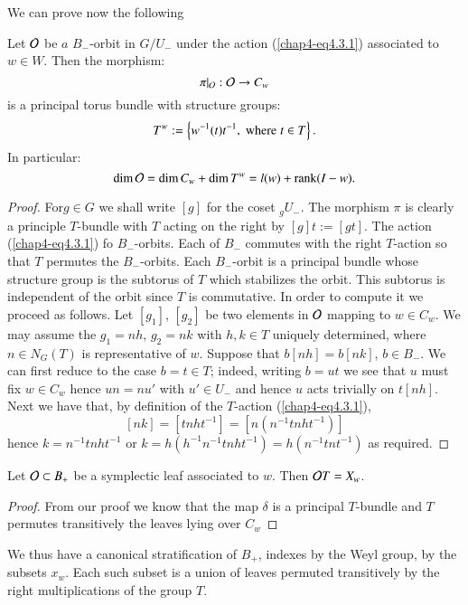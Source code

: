 We can prove now the following

\begin{prop*}
Let $\mathcal{O}$ be $a$ $B_{-}$-orbit in $G/U_{-} $ under the action (\ref{chap4-eq4.3.1}) associated to $w \in W$. Then the morphism:
$$
\pi|_{\mathcal{O}} :\mathcal{O} \rightarrow C_{w}
$$
is a principal torus bundle with structure groups:
$$
T^{w}:= \left\{w^{-1}(t)t^{-1},\; \text{\rm where} \; t\in T\right\}.
$$
In particular:
$$
\dim\mathcal{O} = \dim C_{w} + \dim T^{w} = l(w) + \operatorname{rank}(I -w).
$$
\end{prop*}

\begin{proof}
For\pageoriginale ${g} \in G$ we shall write $[{g}]$ for the coset ${}_{{g}}U_{-}$. The morphism $\pi$ is clearly a principle $T$-bundle with $T$ acting on the right by $[{g}]t := [{gt}]$. The action (\ref{chap4-eq4.3.1}) fo $B_{-}$-orbits. Each of $B_{-}$ commutes with the right $T$-action so that $T$ permutes the $B_{-}$-orbits. Each $B_{-}$-orbit is a principal bundle whose structure group is the subtorus of $T$ which stabilizes the orbit. This subtorus is independent of the orbit since $T$ is commutative. In order to compute it we proceed as follows. Let $[{g_{1}}]$, $[{g_{2}}]$ be two elements in $\mathcal{O}$ mapping to $w \in C_{w}$. We may assume the ${g_{1}} = nh$, ${g_{2}} = nk$ with $h, k \in T$ uniquely determined, where $n\in N_{G}(T)$ is representative of $w$. Suppose that $b[nh] = b[nk]$, $b \in B_{-}$. We can first reduce to the case $b=t \in T$; indeed, writing $b = ut$ we see that $u$ must fix $w \in C_{w}$ hence $un = nu'$ with $u' \in U_{-}$ and hence $u$ acts trivially on $t[nh]$. Next we have that, by definition of the $T$-action (\ref{chap4-eq4.3.1}),
$$
[nk] = \left[tnht^{-1}\right] = \left[n(n^{-1}tnht^{-1})\right]
$$
hence $k=n^{-1}tnht^{-1}$ or $k=h\left(h^{-1}n^{-1}tnht^{-1}\right) = h\left(n^{-1}tnt^{-1}\right)$ as required.
\end{proof}

\begin{lemma*}
Let $\mathcal{O} \subset B_{+}$ be a symplectic leaf associated to $w$. Then $\mathcal{O} T = X_{w}$.
\end{lemma*}

\begin{proof}
From our proof we know that the map $\delta$ is a principal $T$-bundle and $T$ permutes transitively the leaves lying over $C_{w}$
\end{proof}

We thus have a canonical stratification of $B_{+}$, indexes by the Weyl group, by the subsets $x_{w}$. Each such subset is a union of leaves permuted transitively by the right multiplications of the group $T$.

